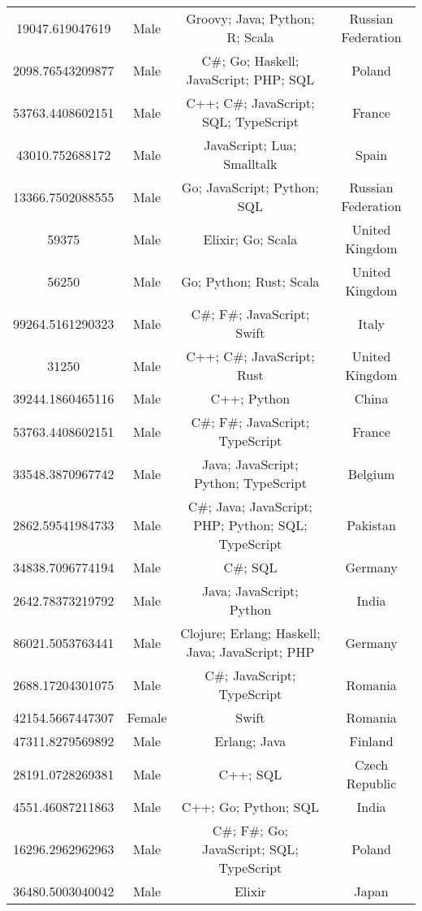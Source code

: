 \begin{center}
\begin{tabular}{ |c|c|c|c| }
19047.619047619  &  Male  &  Groovy; Java; Python; R; Scala  &  Russian Federation  \\ 
2098.76543209877  &  Male  &  C\#; Go; Haskell; JavaScript; PHP; SQL  &  Poland  \\ 
53763.4408602151  &  Male  &  C++; C\#; JavaScript; SQL; TypeScript  &  France  \\ 
43010.752688172  &  Male  &  JavaScript; Lua; Smalltalk  &  Spain  \\ 
13366.7502088555  &  Male  &  Go; JavaScript; Python; SQL  &  Russian Federation  \\ 
59375  &  Male  &  Elixir; Go; Scala  &  United Kingdom  \\ 
56250  &  Male  &  Go; Python; Rust; Scala  &  United Kingdom  \\ 
99264.5161290323  &  Male  &  C\#; F\#; JavaScript; Swift  &  Italy  \\ 
31250  &  Male  &  C++; C\#; JavaScript; Rust  &  United Kingdom  \\ 
39244.1860465116  &  Male  &  C++; Python  &  China  \\ 
53763.4408602151  &  Male  &  C\#; F\#; JavaScript; TypeScript  &  France  \\ 
33548.3870967742  &  Male  &  Java; JavaScript; Python; TypeScript  &  Belgium  \\ 
2862.59541984733  &  Male  &  C\#; Java; JavaScript; PHP; Python; SQL; TypeScript  &  Pakistan  \\ 
34838.7096774194  &  Male  &  C\#; SQL  &  Germany  \\ 
2642.78373219792  &  Male  &  Java; JavaScript; Python  &  India  \\ 
86021.5053763441  &  Male  &  Clojure; Erlang; Haskell; Java; JavaScript; PHP  &  Germany  \\ 
2688.17204301075  &  Male  &  C\#; JavaScript; TypeScript  &  Romania  \\ 
42154.5667447307  &  Female  &  Swift  &  Romania  \\ 
47311.8279569892  &  Male  &  Erlang; Java  &  Finland  \\ 
28191.0728269381  &  Male  &  C++; SQL  &  Czech Republic  \\ 
4551.46087211863  &  Male  &  C++; Go; Python; SQL  &  India  \\ 
16296.2962962963  &  Male  &  C\#; F\#; Go; JavaScript; SQL; TypeScript  &  Poland  \\ 
36480.5003040042  &  Male  &  Elixir  &  Japan  \\ 

\end{tabular}
\end{center}
